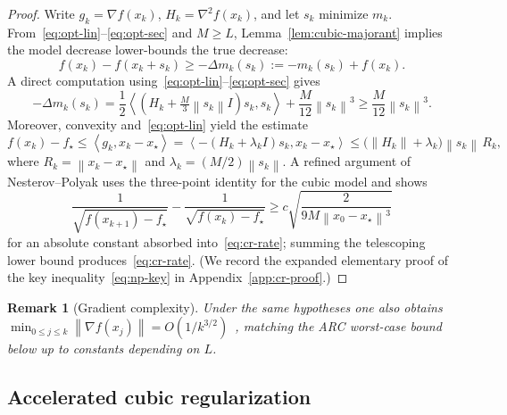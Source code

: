 \documentclass[11pt,a4paper]{article}
\newtheorem{remark}[theorem]{Remark}
\newcommand{\norm}[1]{\left\|#1\right\|}
\newcommand{\inner}[2]{\left\langle #1,#2\right\rangle}
\newcommand{\grad}{\nabla}
\newcommand{\hess}{\nabla^{2}}
\begin{document}
\begin{proof}
Write $g_{k}=\grad f(x_{k})$, $H_{k}=\hess f(x_{k})$, and let $s_{k}$ minimize $m_{k}$.
From~\eqref{eq:opt-lin}--\eqref{eq:opt-sec} and $M\ge L$, Lemma~\ref{lem:cubic-majorant} implies the model decrease lower-bounds the true decrease:
\begin{equation}
\label{eq:decrease}
f(x_{k})-f(x_{k}+s_{k})
\ge
-\Delta m_{k}(s_{k})
:=
-m_{k}(s_{k})+f(x_{k}).
\end{equation}
A direct computation using~\eqref{eq:opt-lin}--\eqref{eq:opt-sec} gives~\cite{nesterov2006cubic}
\begin{equation}
\label{eq:model-dec}
-\Delta m_{k}(s_{k})
=
\frac12\inner{(H_{k}+\tfrac{M}{3}\norm{s_{k}}I)s_{k}}{s_{k}}
+
\frac{M}{12}\norm{s_{k}}^{3}
\ge
\frac{M}{12}\norm{s_{k}}^{3}.
\end{equation}
Moreover, convexity and~\eqref{eq:opt-lin} yield the estimate
\begin{equation}
\label{eq:gap-bound}
f(x_{k})-f_{\star}
\le
\inner{g_{k}}{x_{k}-x_{\star}}
=
\inner{-(H_{k}+\lambda_{k}I)s_{k}}{x_{k}-x_{\star}}
\le
\bigl(\norm{H_{k}}+\lambda_{k}\bigr)\norm{s_{k}}\,R_{k},
\end{equation}
where $R_{k}=\norm{x_{k}-x_{\star}}$ and $\lambda_{k}=(M/2)\norm{s_{k}}$.
A refined argument of Nesterov--Polyak uses the three-point identity for the cubic model and shows
\begin{equation}
\label{eq:np-key}
\frac{1}{\sqrt{f(x_{k+1})-f_{\star}}}
-
\frac{1}{\sqrt{f(x_{k})-f_{\star}}}
\ge
c\sqrt{\frac{2}{9M\norm{x_{0}-x_{\star}}^{3}}}
\end{equation}
for an absolute constant absorbed into~\eqref{eq:cr-rate}; summing the telescoping lower bound produces~\eqref{eq:cr-rate}.
(We record the expanded elementary proof of the key inequality~\eqref{eq:np-key} in Appendix~\ref{app:cr-proof}.)
\end{proof}

\begin{remark}[Gradient complexity]
Under the same hypotheses one also obtains $\min_{0\le j\le k}\norm{\grad f(x_{j})}=O(1/k^{3/2})$~\cite{nesterov2006cubic}, matching the ARC worst-case bound below up to constants depending on $L$.
\end{remark}

\subsection{Accelerated cubic regularization}
\end{document}
